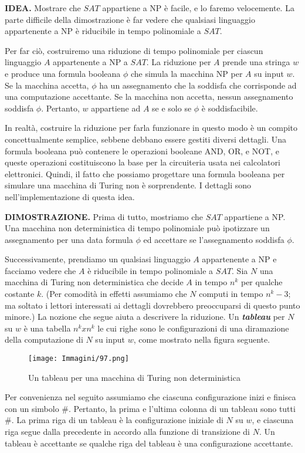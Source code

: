 \documentclass{article}
\begin{document}
\text{}
\newline
\textbf{IDEA.}
Mostrare che $SAT$ appartiene a NP è facile, e lo faremo velocemente. 
La parte difficile della dimostrazione è far vedere che qualsiasi linguaggio appartenente a NP è riducibile in tempo polinomiale a $SAT$.

Per far ciò, costruiremo una riduzione di tempo polinomiale per ciascun linguaggio $A$ appartenente a NP a $SAT$. 
La riduzione per $A$ prende una stringa $w$ e produce una formula booleana $\phi$ che simula la macchina NP per $A$ su input $w$.
Se la macchina accetta, $\phi$ ha un assegnamento che la soddisfa che corrisponde ad una computazione accettante. 
Se la macchina non accetta, nessun assegnamento soddisfa $\phi$.
Pertanto, $w$ appartiene ad $A$ se e solo se $\phi$ è soddisfacibile.

In realtà, costruire la riduzione per farla funzionare in questo modo è un compito concettualmente semplice, sebbene debbano essere gestiti diversi dettagli. 
Una formula booleana può contenere le operazioni booleane AND, OR, e NOT, e queste operazioni costituiscono la base per la circuiteria usata nei calcolatori elettronici. 
Quindi, il fatto che possiamo progettare una formula booleana per simulare una macchina di Turing non è sorprendente.
\newline
I dettagli sono nell'implementazione di questa idea.

\text{}
\newline
\textbf{DIMOSTRAZIONE.}
Prima di tutto, mostriamo che $SAT$ appartiene a NP. 
Una macchina non deterministica di tempo polinomiale può ipotizzare un assegnamento per una data formula $\phi$ ed accettare se l'assegnamento soddisfa $\phi$.

Successivamente, prendiamo un qualsiasi linguaggio $A$ appartenente a NP e facciamo vedere che $A$ è riducibile in tempo polinomiale a $SAT$.
Sia $N$ una macchina di Turing non deterministica che decide $A$ in tempo $n^k$ per qualche costante $k$. 
(Per comodità in effetti assumiamo che $N$ computi in tempo $n^k - 3$; ma soltato i lettori interessati ai dettagli dovrebbero preoccuparsi di questo punto minore.)
La nozione che segue aiuta a descrivere la riduzione.
Un \textbf{\textit{tableau}} per $N$ su $w$ è una tabella $n^k x n^k$ le cui righe sono le configurazioni di una diramazione della computazione di $N$ su input $w$, come mostrato nella figura seguente.
\begin{figure}[H]
    \centering
    \texttt{[image: Immagini/97.png]}
    \caption{Un tableau per una macchina di Turing non deterministica}
    \label{fig:tableau}
\end{figure}
Per convenienza nel seguito assumiamo che ciascuna configurazione inizi e finisca con un simbolo \#.
Pertanto, la prima e l'ultima colonna di un tableau sono tutti \#.
La prima riga di un tableau è la configurazione iniziale di $N$
su $w$, e ciascuna riga segue dalla precedente in accordo alla funzione di transizione di $N$.
Un tableau è accettante se qualche riga del tableau è una configurazione accettante.
\end{document}
